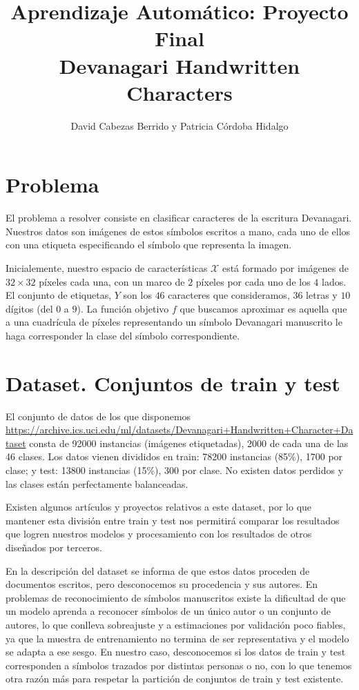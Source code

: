 \documentclass[a4]{article}
\title{Aprendizaje Automático: Proyecto Final \\ Devanagari Handwritten Characters}
\author{David Cabezas Berrido y Patricia Córdoba Hidalgo}
\date{}
\begin{document}
\maketitle
\tableofcontents

\newpage

\section{Problema}

El problema a resolver consiste en clasificar caracteres de la
escritura Devanagari. Nuestros datos son imágenes de estos símbolos
escritos a mano, cada uno de ellos con una etiqueta especificando el
símbolo que representa la imagen.

Inicialemente, nuestro espacio de características $\mathcal{X}$ está
formado por imágenes de $32 \times 32$ píxeles cada una, con un marco
de $2$ píxeles por cada uno de los $4$ lados. El conjunto de
etiquetas, $Y$ son los $46$ caracteres que consideramos, $36$ letras y
$10$ dígitos (del $0$ a $9$). La función objetivo $f$ que buscamos
aproximar es aquella que a una cuadrícula de píxeles representando un
símbolo Devanagari manuscrito le haga corresponder la clase del
símbolo correspondiente.

\section{Dataset. Conjuntos de train y test}

El conjunto de datos de los que disponemos \\
\href{https://archive.ics.uci.edu/ml/datasets/Devanagari+Handwritten+Character+Dataset}{https://archive.ics.uci.edu/ml/datasets/Devanagari+Handwritten+Character+Dataset}
consta de 92000 instancias (imágenes etiquetadas), 2000 de cada una de
las 46 clases. Los datos vienen divididos en train: 78200 instancias
(85\%), 1700 por clase; y test: 13800 instancias (15\%), 300 por
clase. No existen datos perdidos y las clases están perfectamente
balanceadas.

Existen algunos artículos y proyectos relativos a este dataset, por lo
que mantener esta división entre train y test nos permitirá
comparar los resultados que logren nuestros modelos y procesamiento
con los resultados de otros diseñados por terceros. 

En la descripción del dataset se informa de que estos datos proceden
de documentos escritos, pero desconocemos su procedencia y sus
autores. En problemas de reconocimiento de símbolos manuscritos existe
la dificultad de que un modelo aprenda a reconocer símbolos de un
único autor o un conjunto de autores, lo que conlleva sobreajuste y a
estimaciones por validación poco fiables, ya que la muestra de
entrenamiento no termina de ser representativa y el modelo se adapta a
ese sesgo. En nuestro caso, desconocemos si los datos de train y test
corresponden a símbolos trazados por distintas personas o no, con lo
que tenemos otra razón más para respetar la partición de conjuntos de
train y test existente.
\end{document}
